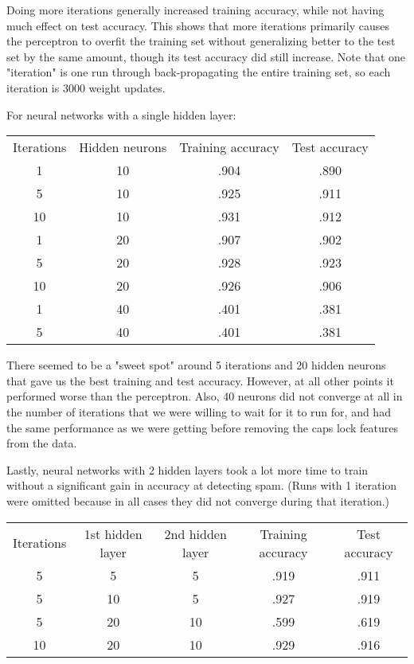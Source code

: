 \documentclass[11pt]{article} %
\begin{document}
\bigskip
Doing more iterations generally increased training accuracy, while not having much effect on test accuracy. This shows that more iterations primarily causes the perceptron to overfit the training set without generalizing better to the test set by the same amount, though its test accuracy did still increase. Note that one "iteration" is one run through back-propagating the entire training set, so each iteration is 3000 weight updates.

For neural networks with a single hidden layer:

\singlespacing
\begin{tabular}{|c|c|c|c|}
\hline
Iterations & Hidden neurons & Training accuracy & Test accuracy \\
1 & 10 & .904 & .890 \\
5 & 10 & .925 & .911 \\
10 & 10 & .931 & .912 \\
1 & 20 & .907 & .902 \\
5 & 20 & .928 & .923 \\
10 & 20 & .926 & .906 \\
1 & 40 & .401 & .381 \\
5 & 40 & .401 & .381 \\
\hline
\end{tabular}
\doublespacing

\bigskip
There seemed to be a "sweet spot" around 5 iterations and 20 hidden neurons that gave us the best training and test accuracy. However, at all other points it performed worse than the perceptron. Also, 40 neurons did not converge at all in the number of iterations that we were willing to wait for it to run for, and had the same performance as we were getting before removing the caps lock features from the data.

Lastly, neural networks with 2 hidden layers took a lot more time to train without a significant gain in accuracy at detecting spam. (Runs with 1 iteration were omitted because in all cases they did not converge during that iteration.)

\singlespacing
\begin{tabular}{|c|c|c|c|c|}
\hline
Iterations & 1st hidden layer & 2nd hidden layer & Training accuracy & Test accuracy \\
5 & 5 & 5 & .919 & .911 \\
5 & 10 & 5 & .927 & .919 \\
5 & 20 & 10 & .599 & .619 \\
10 & 20 & 10 & .929 & .916 \\
\hline
\end{tabular}
\doublespacing
\end{document}
